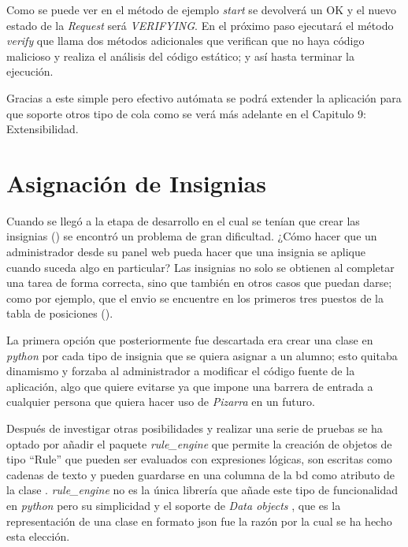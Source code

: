 \documentclass[11pt,spanish,listoffigures,listoftables]{tfgetsinf}
\begin{document}
Como se puede ver en el método de ejemplo \textit{start} se devolverá un OK y el nuevo estado de la \textit{Request} será \textit{VERIFYING}. En el próximo paso ejecutará el método \textit{verify} que llama dos métodos adicionales que verifican que no haya código malicioso y realiza el análisis del código estático; y así hasta terminar la ejecución.

Gracias a este simple pero efectivo autómata se podrá extender la aplicación para que soporte otros tipo de \gls{cola} como se verá más adelante en el Capitulo 9: Extensibilidad.

\section{Asignación de Insignias}

Cuando se llegó a la etapa de desarrollo en el cual se tenían que crear las \gls{insignia}s () se encontró un problema de gran dificultad. ¿Cómo hacer que un \gls{administrador} desde su panel web pueda hacer que una \gls{insignia} se aplique cuando suceda algo en particular? Las \gls{insignia}s no solo se obtienen al completar una \gls{tarea} de forma correcta, sino que también en otros casos que puedan darse; como por ejemplo, que el \gls{envio} se encuentre en los primeros tres puestos de la tabla de posiciones ().

La primera opción que posteriormente fue descartada era crear una clase en \textit{python} por cada tipo de \gls{insignia} que se quiera asignar a un \gls{alumno}; esto quitaba dinamismo y forzaba al \gls{administrador} a modificar el código fuente de la aplicación, algo que quiere evitarse ya que impone una barrera de entrada a cualquier persona que quiera hacer uso de \textit{Pizarra} en un futuro.

Después de investigar otras posibilidades y realizar una serie de pruebas se ha optado por añadir el \gls{paquete} \textit{rule\_engine} que permite la creación de objetos de tipo ``Rule'' que pueden ser evaluados con expresiones lógicas, son escritas como cadenas de texto y pueden guardarse en una columna de la \acrshort{bd} como atributo de la clase . \textit{rule\_engine} no es la única librería que añade este tipo de funcionalidad en \textit{python} pero su simplicidad y el soporte de \textit{Data objects} \cite{link-rule-engine}, que es la representación de una clase en formato \acrshort{json} fue la razón por la cual se ha hecho esta elección.
\end{document}

